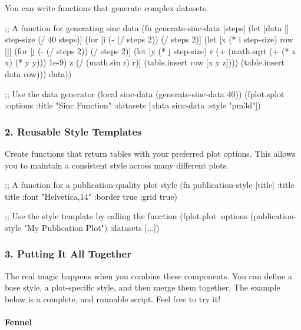 \documentclass[12pt, letterpaper]{article}
\begin{document}
	You can write functions that generate complex datasets.
	
	\begin{fennelcode}
;; A function for generating sinc data
(fn generate-sinc-data [steps]
(let [data []
step-size (/ 40 steps)]
(for [i (- (/ steps 2)) (/ steps 2)]
(let [x (* i step-size)
row []]
(for [j (- (/ steps 2)) (/ steps 2)]
(let [y (* j step-size)
r (+ (math.sqrt (+ (* x x) (* y y))) 1e-9)
z (/ (math.sin r) r)]
(table.insert row [x y z])))
(table.insert data row)))
data))

;; Use the data generator
(local sinc-data (generate-sinc-data 40))
(fplot.splot {:options {:title "Sinc Function"}
	:datasets [{:data sinc-data :style "pm3d"}]}) 
	\end{fennelcode}
	
	\subsubsection*{2. Reusable Style Templates}
	
	Create functions that return tables with your preferred plot options. This allows you to maintain a consistent style across many different plots.
	
	\begin{fennelcode}
;; A function for a publication-quality plot style
(fn publication-style [title]
{:title title
	:font "Helvetica,14"
	:border true
	:grid true})

;; Use the style template by calling the function
(fplot.plot
{:options (publication-style "My Publication Plot")
	:datasets [...]})
	\end{fennelcode}
	
	\subsubsection*{3. Putting It All Together}
	
	The real magic happens when you combine these components. You can define a base style, a plot-specific style, and then merge them together. The example below is a complete, and runnable script. Feel free to try it!
	
	\paragraph{Fennel}
	
\end{document}
